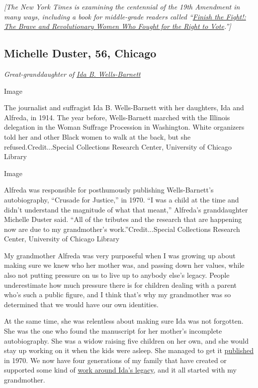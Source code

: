 \emph{{[}The New York Times is examining the centennial of the 19th
Amendment in many ways, including a book for middle-grade readers called
``}\href{https://www.nytimes3xbfgragh.onion/2020/07/24/books/finish-the-fight-excerpt.html}{\emph{Finish
the Fight!: The Brave and Revolutionary Women Who Fought for the Right
to Vote}}\emph{.''{]}}

\hypertarget{michelle-duster-56-chicago}{%
\subsection{Michelle Duster, 56,
Chicago}\label{michelle-duster-56-chicago}}

\emph{Great-granddaughter of}
\href{https://www.nytimes3xbfgragh.onion/interactive/2018/obituaries/overlooked-ida-b-wells.html}{\emph{Ida
B. Wells-Barnett}}

Image

The journalist and suffragist Ida B. Wells-Barnett with her daughters,
Ida and Alfreda, in 1914. The year before, Wells-Barnett marched with
the Illinois delegation in the Woman Suffrage Procession in Washington.
White organizers told her and other Black women to walk at the back, but
she refused.Credit...Special Collections Research Center, University of
Chicago Library

Image

Alfreda was responsible for posthumously publishing Wells-Barnett's
autobiography, ``Crusade for Justice,'' in 1970. ``I was a child at the
time and didn't understand the magnitude of what that meant,'' Alfreda's
granddaughter Michelle Duster said. ``All of the tributes and the
research that are happening now are due to my grandmother's
work.''Credit...Special Collections Research Center, University of
Chicago Library

My grandmother Alfreda was very purposeful when I was growing up about
making sure we knew who her mother was, and passing down her values,
while also not putting pressure on us to live up to anybody else's
legacy. People underestimate how much pressure there is for children
dealing with a parent who's such a public figure, and I think that's why
my grandmother was so determined that we would have our own identities.

At the same time, she was relentless about making sure Ida was not
forgotten. She was the one who found the manuscript for her mother's
incomplete autobiography. She was a widow raising five children on her
own, and she would stay up working on it when the kids were asleep. She
managed to get it
\href{https://press.uchicago.edu/ucp/books/book/chicago/C/bo49856620.html}{published}
in 1970. We now have four generations of my family that have created or
supported some kind of
\href{https://www.simonandschuster.com/books/Ida-B-the-Queen/Michelle-Duster/9781982129811}{work
around Ida's legacy}, and it all started with my grandmother.

